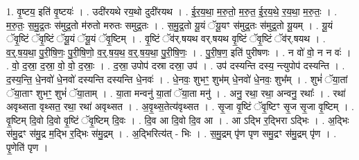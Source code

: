 \documentclass[17pt]{extarticle}
\begin{document}
1. वृ॒ष्टय॒ इति॑ वृ॒ष्टयः॑ । . उदी॑रयथे रय॒थो दुदी॑रयथ । . ई॒र॒य॒था॒ म॒रु॒तो॒ म॒रु॒त॒ ई॒र॒य॒थे॒ र॒य॒था॒ म॒रु॒तः॒ । . म॒रु॒तः॒ स॒मु॒द्र॒तः स॑मुद्र॒तो म॑रुतो मरुतः समुद्र॒तः । . स॒मु॒द्र॒तो यू॒यं ॅयू॒यꣳ स॑मुद्र॒तः स॑मुद्र॒तो यू॒यम् । . यू॒यं ॅवृ॒ष्टिं ॅवृ॒ष्टिं ॅयू॒यं ॅयू॒यं ॅवृ॒ष्टिम् । . वृ॒ष्टिं ॅव॑र्.षयथ वर्.षयथ वृ॒ष्टिं ॅवृ॒ष्टिं ॅव॑र्.षयथ । . व॒र्॒.ष॒य॒था॒ पु॒री॒षि॒णः॒ पु॒री॒षि॒णो॒ व॒र्॒.ष॒य॒थ॒ व॒र्॒.ष॒य॒था॒ पु॒री॒षि॒णः॒ । . पु॒री॒ष॒ण॒ इति॑ पुरीषणः । . न वो॑ वो॒ न न वः॑ । . वो॒ द॒स्रा॒ द॒स्रा॒ वो॒ वो॒ द॒स्राः॒ । . द॒स्रा॒ उपोप॑ दस्रा दस्रा॒ उप॑ । . उप॑ दस्यन्ति दस्य॒ न्त्युपोप॑ दस्यन्ति । . द॒स्य॒न्ति॒ धे॒नवो॑ धे॒नवो॑ दस्यन्ति दस्यन्ति धे॒नवः॑ । . धे॒नवः॒ शुभꣳ॒॒ शुभ॑म् धे॒नवो॑ धे॒नवः॒ शुभ᳚म् । . शुभं॑ ॅया॒तां ॅया॒ताꣳ शुभꣳ॒॒ शुभं॑ ॅया॒ताम् । . या॒ता मन्वनु॑ या॒तां ॅया॒ता मनु॑ । . अनु॒ रथा॒ रथा॒ अन्वनु॒ रथाः᳚ । . रथा॑ अवृथ्सता वृथ्सत॒ रथा॒ रथा॑ अवृथ्सत । . अ॒वृ॒थ्स॒तेत्य॑वृथ्सत । . सृ॒जा वृ॒ष्टिं ॅवृ॒ष्टिꣳ सृ॒ज सृ॒जा वृ॒ष्टिम् । . वृ॒ष्टिम् दि॒वो दि॒वो वृ॒ष्टिं ॅवृ॒ष्टिम् दि॒वः । . दि॒व आ दि॒वो दि॒व आ । . आ ऽद्भि र॒द्भिरा ऽद्भिः । . अ॒द्भिः स॑मु॒द्रꣳ स॑मु॒द्र म॒द्भि र॒द्भिः स॑मु॒द्रम् । . अ॒द्भिरित्य॑त् - भिः । . स॒मु॒द्रम् पृ॑ण पृण समु॒द्रꣳ स॑मु॒द्रम् पृ॑ण । . पृ॒णेति॑ पृण । \newline
\end{document}
